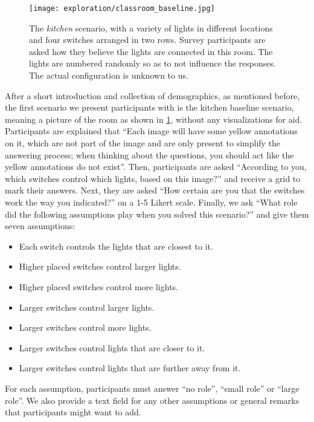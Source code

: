     \begin{figure}
        \centering
        \texttt{[image: exploration/classroom\_baseline.jpg]}
        \caption{The \textit{kitchen} scenario, with a variety of lights in different locations and four switches arranged in two rows. Survey participants are asked how they believe the lights are connected in this room. The lights are numbered randomly so as to not influence the responses. The actual configuration is unknown to us.}
        \label{fig:explor:kitchen_baseline}
    \end{figure}
    
    After a short introduction and collection of demographics, as mentioned before, the first scenario we present participants with is the kitchen baseline scenario, meaning a picture of the room as shown in \ref{fig:explor:kitchen_baseline}, without any visualizations for aid. Participants are explained that ``Each image will have some yellow annotations on it, which are not part of the image and are only present to simplify the answering process; when thinking about the questions, you should act like the yellow annotations do not exist''. Then, participants are asked ``According to you, which switches control which lights, based on this image?'' and receive a grid to mark their answers. Next, they are asked ``How certain are you that the switches work the way you indicated?'' on a 1-5 Likert scale. Finally, we ask ``What role did the following assumptions play when you solved this scenario?'' and give them seven assumptions:
    \begin{itemize}
        \item Each switch controls the lights that are closest to it.
        \item Higher placed switches control larger lights.
        \item Higher placed switches control more lights.
        \item Larger switches control larger lights.
        \item Larger switches control more lights.
        \item Larger switches control lights that are closer to it.
        \item Larger switches control lights that are further away from it.
    \end{itemize}
    For each assumption, participants must answer ``no role'', ``small role'' or ``large role''. We also provide a text field for any other assumptions or general remarks that participants might want to add.
    
